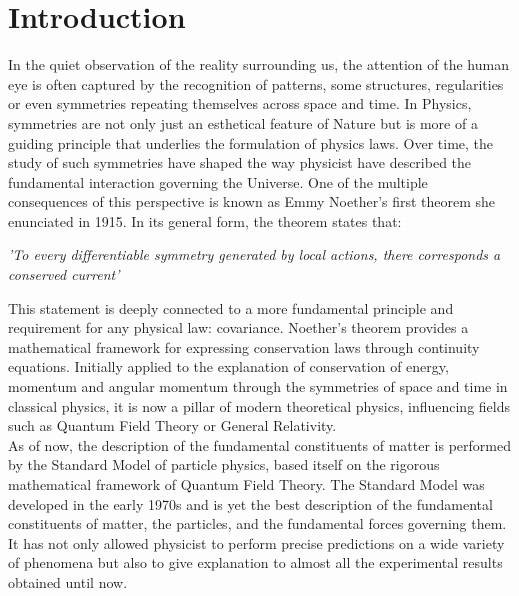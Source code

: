 \chapter{Introduction}

In the quiet observation of the reality surrounding us, the attention of the human eye is often captured by the recognition of patterns, some structures, regularities or even symmetries repeating themselves across space and time. In Physics, symmetries are not only just an esthetical feature of Nature but is more of a guiding principle that underlies the formulation of physics laws. Over time, the study of such symmetries have shaped the way physicist have described the fundamental interaction governing the Universe. One of the multiple consequences of this perspective is known as Emmy Noether's first theorem she enunciated in 1915. In its general form, the theorem states that: 
\begin{center}
  \textit{'To every differentiable symmetry generated by local actions, there corresponds a conserved current'}
\end{center}

This statement is deeply connected to a more fundamental principle and requirement for any physical law: covariance. Noether's theorem provides a mathematical framework for expressing conservation laws through continuity equations. Initially applied to the explanation of conservation of energy, momentum and angular momentum through the symmetries of space and time in classical physics, it is now a pillar of modern theoretical physics, influencing fields such as Quantum Field Theory or General Relativity. \\
As of now, the description of the fundamental constituents of matter is performed by the Standard Model of particle physics, based itself on the rigorous mathematical framework of Quantum Field Theory. 
The Standard Model was developed in the early 1970s and is yet the best description of the fundamental constituents of matter, the particles, and the fundamental forces governing them. It has not only allowed physicist to perform precise predictions on a wide variety of phenomena but also to give explanation to almost all the experimental results obtained until now. \\ 

